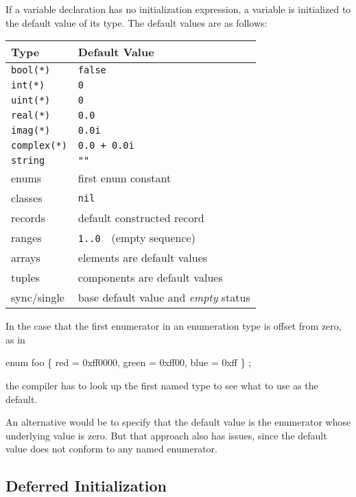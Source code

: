 If a variable declaration has no initialization expression, a variable
is initialized to the default value of its type.  The default values
are as follows:
\begin{center}
\begin{tabular}{|l|l|}
\hline
{\bf Type} & {\bf Default Value} \\
\hline
{\tt bool(*)} & {\tt false} \\
{\tt int(*)} & {\tt 0} \\
{\tt uint(*)} & {\tt 0} \\
{\tt real(*)} & {\tt 0.0} \\
{\tt imag(*)} & {\tt 0.0i} \\
{\tt complex(*)} & {\tt 0.0 + 0.0i} \\
{\tt string} & {\tt ""} \\
enums & first enum constant \\
classes & {\tt nil} \\
records & default constructed record \\
ranges & {\tt 1..0} $ $ $ $ (empty sequence) \\
arrays & elements are default values \\
tuples & components are default values \\
sync/single & base default value and \emph{empty} status \\
\hline
\end{tabular}
\end{center}

\begin{openissue}
In the case that the first enumerator in an enumeration type is offset
from zero, as in
\begin{example}
enum foo \{ red = 0xff0000, green = 0xff00, blue = 0xff \} ;
\end{example}
the compiler has to look up the first named type to see what to use as
the default.  

An alternative would be to specify that the default
value is the enumerator whose underlying value is zero.  But that approach also
has issues, since the default value does not conform to any named enumerator.
\end{openissue}

\subsection{Deferred Initialization}
\label{Noinit_Capability}

